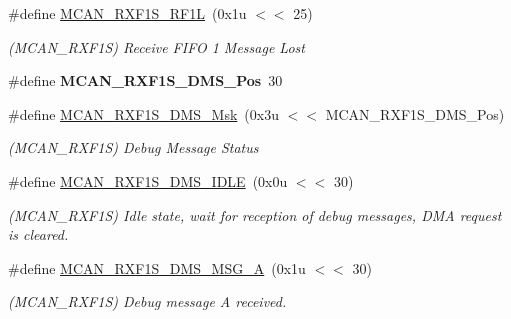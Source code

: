 \begin{DoxyCompactItemize}
\mbox{\label{group__SAME70__MCAN_ga0f77d66bd293f9f8f88eed2762aa412c}} 
\#define \mbox{\hyperlink{group__SAME70__MCAN_ga0f77d66bd293f9f8f88eed2762aa412c}{M\+C\+A\+N\+\_\+\+R\+X\+F1\+S\+\_\+\+R\+F1L}}~(0x1u $<$$<$ 25)
\begin{DoxyCompactList}\small\item\em (M\+C\+A\+N\+\_\+\+R\+X\+F1S) Receive F\+I\+FO 1 Message Lost \end{DoxyCompactList}\item 
\mbox{\label{group__SAME70__MCAN_ga04f26ee7faea57293b7261973171ca4b}} 
\#define {\bfseries M\+C\+A\+N\+\_\+\+R\+X\+F1\+S\+\_\+\+D\+M\+S\+\_\+\+Pos}~30
\item 
\mbox{\label{group__SAME70__MCAN_ga0888850ac39cee1b12e1a0ca0e075044}} 
\#define \mbox{\hyperlink{group__SAME70__MCAN_ga0888850ac39cee1b12e1a0ca0e075044}{M\+C\+A\+N\+\_\+\+R\+X\+F1\+S\+\_\+\+D\+M\+S\+\_\+\+Msk}}~(0x3u $<$$<$ M\+C\+A\+N\+\_\+\+R\+X\+F1\+S\+\_\+\+D\+M\+S\+\_\+\+Pos)
\begin{DoxyCompactList}\small\item\em (M\+C\+A\+N\+\_\+\+R\+X\+F1S) Debug Message Status \end{DoxyCompactList}\item 
\mbox{\label{group__SAME70__MCAN_ga52dd02e67510c5d2f576d62d1a7abdfb}} 
\#define \mbox{\hyperlink{group__SAME70__MCAN_ga52dd02e67510c5d2f576d62d1a7abdfb}{M\+C\+A\+N\+\_\+\+R\+X\+F1\+S\+\_\+\+D\+M\+S\+\_\+\+I\+D\+LE}}~(0x0u $<$$<$ 30)
\begin{DoxyCompactList}\small\item\em (M\+C\+A\+N\+\_\+\+R\+X\+F1S) Idle state, wait for reception of debug messages, D\+MA request is cleared. \end{DoxyCompactList}\item 
\mbox{\label{group__SAME70__MCAN_gae6be46d845aab5f32f5ffd7bdf9f67a4}} 
\#define \mbox{\hyperlink{group__SAME70__MCAN_gae6be46d845aab5f32f5ffd7bdf9f67a4}{M\+C\+A\+N\+\_\+\+R\+X\+F1\+S\+\_\+\+D\+M\+S\+\_\+\+M\+S\+G\+\_\+A}}~(0x1u $<$$<$ 30)
\begin{DoxyCompactList}\small\item\em (M\+C\+A\+N\+\_\+\+R\+X\+F1S) Debug message A received. \end{DoxyCompactList}\item 

\end{DoxyCompactItemize}

